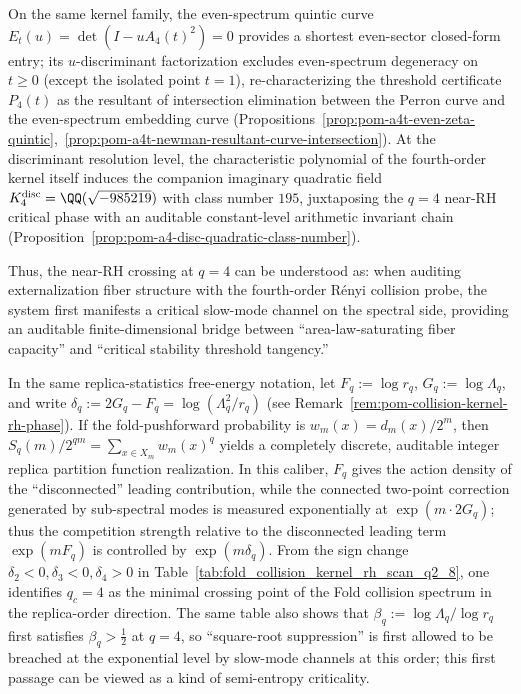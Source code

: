 On the same kernel family, the even-spectrum quintic curve \(E_t(u)=\det(I-uA_4(t)^2)=0\) provides a shortest even-sector closed-form entry; its \(u\)-discriminant factorization excludes even-spectrum degeneracy on \(t\ge 0\) (except the isolated point \(t=1\)), re-characterizing the threshold certificate \(P_4(t)\) as the resultant of intersection elimination between the Perron curve and the even-spectrum embedding curve (Propositions~\ref{prop:pom-a4t-even-zeta-quintic},~\ref{prop:pom-a4t-newman-resultant-curve-intersection}).
At the discriminant resolution level, the characteristic polynomial of the fourth-order kernel itself induces the companion imaginary quadratic field \(K_4^{\mathrm{disc}}=\QQ(\sqrt{-985219})\) with class number \(195\), juxtaposing the \(q=4\) near-RH critical phase with an auditable constant-level arithmetic invariant chain (Proposition~\ref{prop:pom-a4-disc-quadratic-class-number}).
\par
Thus, the near-RH crossing at \(q=4\) can be understood as: when auditing externalization fiber structure with the fourth-order Rényi collision probe, the system first manifests a critical slow-mode channel on the spectral side, providing an auditable finite-dimensional bridge between ``area-law-saturating fiber capacity'' and ``critical stability threshold tangency.''
\par
In the same replica-statistics free-energy notation, let \(F_q:=\log r_q\), \(G_q:=\log\Lambda_q\), and write
\(\delta_q:=2G_q-F_q=\log(\Lambda_q^2/r_q)\) (see Remark~\ref{rem:pom-collision-kernel-rh-phase}).
If the fold-pushforward probability is \(w_m(x)=d_m(x)/2^m\), then
\(
S_q(m)/2^{qm}=\sum_{x\in X_m}w_m(x)^q
\)
yields a completely discrete, auditable integer replica partition function realization.
In this caliber, \(F_q\) gives the action density of the ``disconnected'' leading contribution, while the connected two-point correction generated by sub-spectral modes is measured exponentially at \(\exp(m\cdot 2G_q)\); thus the competition strength relative to the disconnected leading term \(\exp(mF_q)\) is controlled by \(\exp(m\delta_q)\).
From the sign change \(\delta_2<0,\delta_3<0,\delta_4>0\) in Table~\ref{tab:fold_collision_kernel_rh_scan_q2_8}, one identifies \(q_c=4\) as the minimal crossing point of the Fold collision spectrum in the replica-order direction.
The same table also shows that \(\beta_q:=\log\Lambda_q/\log r_q\) first satisfies \(\beta_q>\tfrac12\) at \(q=4\), so ``square-root suppression'' is first allowed to be breached at the exponential level by slow-mode channels at this order; this first passage can be viewed as a kind of semi-entropy criticality.
